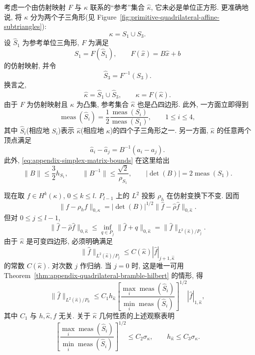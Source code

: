 
考虑一个由仿射映射 $F$ 与 $\kappa$ 联系的``参考''集合 $\hat\kappa$,
它未必是单位正方形. 更准确地说, 将 $\kappa$ 分为两个子三角形(见
Figure~\ref{fig:primitive-quadrilateral-affine-subtriangles}):
\[
\kappa=S_1\cup S_3.
\]
设 $\hat S_1$ 为参考单位三角形, $F$ 为满足
\[
S_1=F(\hat S_1),
\qquad F(\hat x)=B\hat x+b
\]
的仿射映射, 并令
\[
\hat S_3=F^{-1}(S_3).
\]
换言之,
\[
\hat\kappa=\hat S_1\cup\hat S_3,
\qquad\kappa=F(\hat\kappa).
\]
由于 $F$ 为仿射映射且 $\kappa$ 为凸集, 参考集合 $\hat\kappa$ 也是凸四边形.
此外, 一方面立即得到
\[
\operatorname{meas}(\hat S_i)
=\frac12\frac{\operatorname{meas}(S_i)}{\operatorname{meas}(S_1)},
\qquad1\leq i\leq4,
\]
其中 $\hat S_i$(相应地 $S_i$)表示 $\hat\kappa$(相应地 $\kappa$)的四个子三角形之一.
另一方面, $\hat\kappa$ 的任意两个顶点满足
\[
\hat a_i-\hat a_j=B^{-1}(a_i-a_j).
\]
此外, \eqref{eq:appendix-simplex-matrix-bounds} 在这里给出
\[
\|B\|\leq\frac32h_{S_1},
\qquad\|B^{-1}\|\leq\frac{\sqrt2}{\rho_{S_1}},
\qquad|\det(B)|=2\operatorname{meas}(S_1).
\]

现在取 $f\in H^k(\kappa)$, $0\leq k\leq l$. $P_{l-1}$ 上的
$L^2$ 投影 $\rho_h$ 在仿射变换下不变. 因而
\[
\|f-\rho_hf\|_{0,\kappa}
=|\det(B)|^{1/2}\|\hat f-\hat\rho\hat f\|_{0,\hat\kappa}.
\]
但对 $0\leq j\leq l-1$,
\[
\|\hat f-\hat\rho\hat f\|_{0,\hat\kappa}
\leq\inf_{q\in P_j}\|\hat f+q\|_{0,\hat\kappa}
=\|\hat f\|_{L^2(\hat\kappa)/P_j}.
\]
由于 $\hat\kappa$ 是可变四边形, 必须明确满足
\[
\|\hat f\|_{L^2(\hat\kappa)/P_j}
\leq C(\hat\kappa)|\hat f|_{j+1,\hat\kappa}
\]
的常数 $C(\hat\kappa)$. 对次数 $j$ 作归纳. 当 $j=0$ 时, 这是唯一可用
Theorem~\ref{thm:appendix-quadrilateral-bramble-hilbert} 的情形, 得
\[
\|\hat f\|_{L^2(\hat\kappa)/P_0}
\leq C_1h_{\hat\kappa}
\left[\frac{\max_i\operatorname{meas}(\hat S_i)}
{\min_i\operatorname{meas}(\hat S_i)}\right]^{1/2}
|\hat f|_{1,\hat\kappa},
\]
其中 $C_1$ 与 $h,\hat\kappa,f$ 无关. 关于 $\hat\kappa$ 几何性质的上述观察表明
\[
\left[\frac{\max_i\operatorname{meas}(\hat S_i)}
{\min_i\operatorname{meas}(\hat S_i)}\right]^{1/2}
\leq C_2\sigma_\kappa,
\qquad h_{\hat\kappa}\leq C_3\sigma_\kappa.
\]


